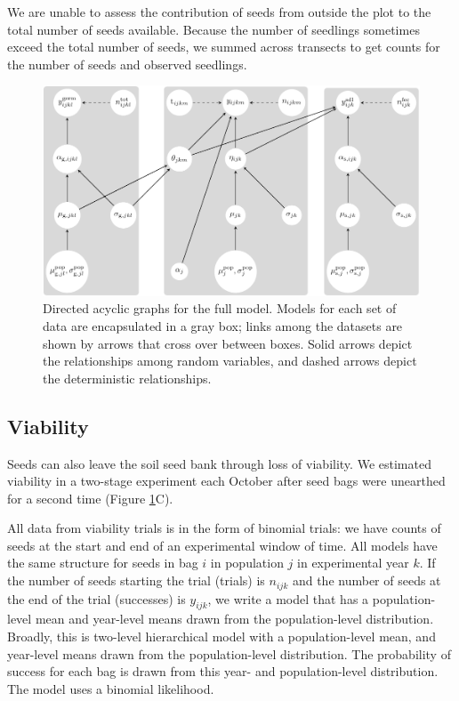\documentclass[12pt, oneside, titlepage]{article}   	%
\begin{document}
We are unable to assess the contribution of seeds from outside the plot to the total number of seeds available. Because the number of seedlings sometimes exceed the total number of seeds, we summed across transects to get counts for the number of seeds and observed seedlings.

\begin{figure}[!h]
       \includegraphics[width=\textwidth]{../../manuscript/figures/dag-seed-bag.pdf}  
    \caption{ Directed acyclic graphs for the full model. Models for each set of data are encapsulated in a gray box; links among the datasets are shown by arrows that cross over between boxes. Solid arrows depict the relationships among random variables, and dashed arrows depict the deterministic relationships. }
 \label{fig:dag-seed-bag}
\end{figure}

\subsection{Viability}

Seeds can also leave the soil seed bank through loss of viability. We estimated viability in a two-stage experiment each October after seed bags were unearthed for a second time (Figure \ref{fig:dag-seed-bag}C). 

All data from viability trials is in the form of binomial trials: we have counts of seeds at the start and end of an experimental window of time. All models have the same structure for seeds in bag $i$ in population $j$ in experimental year $k$. If the number of seeds starting the trial (trials) is $n_{ijk}$ and the number of seeds at the end of the trial (successes) is $y_{ijk}$, we write a model that has a population-level mean and year-level means drawn from the population-level distribution. Broadly, this is two-level hierarchical model with a population-level mean, and year-level means drawn from the population-level distribution. The probability of success for each bag is drawn from this year- and population-level distribution. The model uses a binomial likelihood. 
\end{document}
